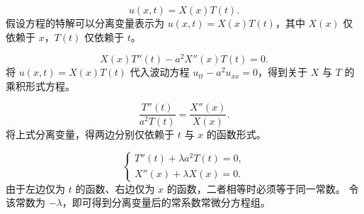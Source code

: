 \begin{example}
  \begin{dxsolution}
\[
u(x,t)=X(x)T(t).
\]
\tcblower
假设方程的特解可以分离变量表示为 $u(x,t)=X(x)T(t)$，其中 $X(x)$ 仅依赖于 $x$，$T(t)$ 仅依赖于 $t$。
\end{dxsolution}

\begin{dxsolution}
\[
X(x)T''(t)-a^2X''(x)T(t)=0.
\]
\tcblower
将 $u(x,t)=X(x)T(t)$ 代入波动方程 $\displaystyle u_{tt}-a^2u_{xx}=0$，得到关于 $X$ 与 $T$ 的乘积形式方程。
\end{dxsolution}

\begin{dxsolution}
\[
\frac{T''(t)}{a^2T(t)}=\frac{X''(x)}{X(x)}.
\]
\tcblower
将上式分离变量，得两边分别仅依赖于 $t$ 与 $x$ 的函数形式。
\end{dxsolution}

\begin{dxsolution}
\[
\begin{cases}
T''(t)+\lambda a^2T(t)=0,\\[4pt]
X''(x)+\lambda X(x)=0.
\end{cases}
\]
\tcblower
由于左边仅为 $t$ 的函数、右边仅为 $x$ 的函数，二者相等时必须等于同一常数。  
令该常数为 $-\lambda$，即可得到分离变量后的常系数常微分方程组。
\end{dxsolution}  
\end{example}


